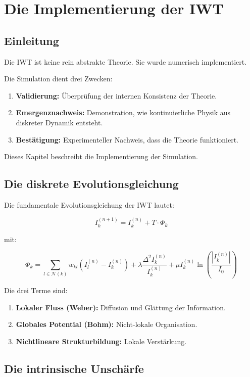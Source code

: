 \chapter{Die Implementierung der IWT}

\section{Einleitung}

Die IWT ist keine rein abstrakte Theorie. Sie wurde numerisch implementiert.

Die Simulation dient drei Zwecken:

\begin{enumerate}
\item \textbf{Validierung:} Überprüfung der internen Konsistenz der Theorie.
\item \textbf{Emergenznachweis:} Demonstration, wie kontinuierliche Physik aus diskreter Dynamik entsteht.
\item \textbf{Bestätigung:} Experimenteller Nachweis, dass die Theorie funktioniert.
\end{enumerate}

Dieses Kapitel beschreibt die Implementierung der Simulation.

\section{Die diskrete Evolutionsgleichung}

Die fundamentale Evolutionsgleichung der IWT lautet:

\[
I_k^{(n+1)} = I_k^{(n)} + T \cdot \Phi_k
\]

mit:

\[
\Phi_k = \sum_{l \in \mathcal{N}(k)} w_{kl}(I_l^{(n)} - I_k^{(n)}) + \lambda \frac{\Delta^2 I_k^{(n)}}{I_k^{(n)}} + \mu I_k^{(n)} \ln \left( \frac{|I_k^{(n)}|}{I_0} \right)
\]

Die drei Terme sind:

\begin{enumerate}
\item \textbf{Lokaler Fluss (Weber):} Diffusion und Glättung der Information.
\item \textbf{Globales Potential (Bohm):} Nicht-lokale Organisation.
\item \textbf{Nichtlineare Strukturbildung:} Lokale Verstärkung.
\end{enumerate}

\section{Die intrinsische Unschärfe}

